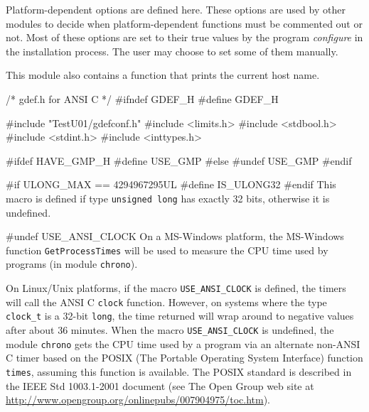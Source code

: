
Platform-dependent options are defined here.
These options are used by other modules to decide when
platform-dependent functions must be commented out or not.
Most of these options are set to their true values by the program
{\it configure} in the installation process. The user may choose
to set some of them manually.
\iffalse
Each option must either be left undefined (i.e., the corresponding
macro is put to false, using ``\texttt{\#undef})
or can be given its proper value (using ``\texttt{\#define} commands).
An option can be defined only under certain conditions.
For example, \texttt{USE\_GMP} can be defined only if GMP
is available, and so on.
\fi
This module also contains a function that prints the current host name.

\code\hide
/* gdef.h  for ANSI C */
#ifndef GDEF_H
#define GDEF_H

#include "TestU01/gdefconf.h"
#include <limits.h>
#include <stdbool.h>
#include <stdint.h>
#include <inttypes.h>

#ifdef HAVE_GMP_H
#define USE_GMP
#else
#undef USE_GMP
#endif
\endhide
\endcode


\hide
\code


#if ULONG_MAX == 4294967295UL
#define IS_ULONG32
#endif
\endcode
  \tab This macro is defined if type \texttt {unsigned long} has
  exactly 32 bits, otherwise it is undefined.
 \endtab
\endhide
\code


#undef USE_ANSI_CLOCK
\endcode
  \tab On a MS-Windows platform,
  the MS-Windows function \texttt{GetProcessTimes} will be used to measure
  the CPU time used by programs (in module \texttt{chrono}).

  On Linux/Unix platforms, if the macro
  \texttt{USE\_ANSI\_CLOCK} is defined, the timers %
  will call the ANSI C  \texttt{clock} function. However, on systems
  where the type \texttt{clock\_t} is a 32-bit \texttt{long},
  the time returned
  will wrap around to negative values after about 36 minutes.
  When the macro \texttt{USE\_ANSI\_CLOCK} is undefined, the
  module \texttt{chrono} gets the CPU time used by a program via an
  alternate non-ANSI C timer
  based on the POSIX (The Portable Operating System Interface)
  function \texttt{times}, assuming this function is available. The POSIX
  standard is described in the IEEE Std 1003.1-2001 document (see
  The Open Group web site at
  \url{http://www.opengroup.org/onlinepubs/007904975/toc.htm}).
 \endtab
\code


